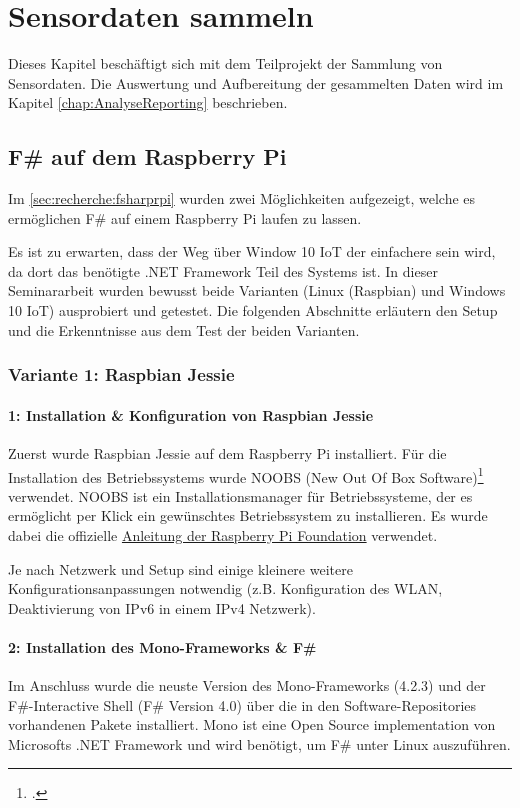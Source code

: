 
\chapter{Sensordaten sammeln}
Dieses Kapitel beschäftigt sich mit dem Teilprojekt der Sammlung von Sensordaten. Die Auswertung und Aufbereitung der gesammelten Daten wird im Kapitel \ref{chap:AnalyseReporting}  beschrieben.


\section{F\# auf dem Raspberry Pi}
Im \cref{sec:recherche:fsharprpi}  wurden zwei Möglichkeiten aufgezeigt, welche es ermöglichen F\# auf einem Raspberry Pi laufen zu lassen.

Es ist zu erwarten, dass der Weg über Window 10 IoT der einfachere sein wird, da dort das benötigte .NET Framework Teil des Systems ist. In dieser Seminararbeit wurden bewusst beide Varianten (Linux (Raspbian) und Windows 10 IoT) ausprobiert und getestet. Die folgenden Abschnitte erläutern den Setup und die Erkenntnisse aus dem Test der beiden Varianten. 

\subsection{Variante 1: Raspbian Jessie}
\subsubsection{1: Installation \& Konfiguration von Raspbian Jessie}
\label{sec:collect:fsharp:variant1:installation}
Zuerst wurde Raspbian Jessie auf dem Raspberry Pi installiert. Für die Installation des Betriebssystems wurde NOOBS (New Out Of Box Software)\footcite{NOOBS_2016-04-25} verwendet. NOOBS ist ein Installationsmanager für Betriebssysteme, der es ermöglicht per Klick ein gewünschtes Betriebssystem zu installieren. Es wurde dabei die offizielle \hyperlink{https://www.raspberrypi.org/documentation/installation/noobs.md}{Anleitung der Raspberry Pi Foundation} verwendet.

Je nach Netzwerk und Setup sind einige kleinere weitere Konfigurationsanpassungen notwendig (z.B. Konfiguration des WLAN, Deaktivierung von IPv6 in einem IPv4 Netzwerk).


\subsubsection{2: Installation des Mono-Frameworks \& F\#}
\label{sec:collect:fsharp:variant1:mono}
Im Anschluss wurde die neuste Version des Mono-Frameworks (4.2.3) und der F\#-Interactive Shell (F\# Version 4.0) über die in den Software-Repositories vorhandenen Pakete installiert. Mono ist eine Open Source implementation von Microsofts .NET Framework und wird benötigt, um F\# unter Linux auszuführen.

